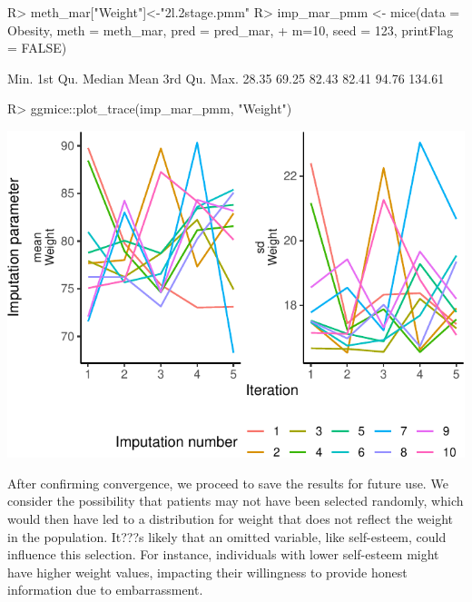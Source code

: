 \documentclass[
]{jss}
\begin{document}
\begin{CodeChunk}
\begin{CodeInput}
R> meth_mar["Weight"]<-"2l.2stage.pmm" 
R> imp_mar_pmm <- mice(data = Obesity, meth = meth_mar, pred = pred_mar,
+                     m=10, seed = 123, printFlag = FALSE)
\end{CodeInput}
\end{CodeChunk}

\begin{CodeChunk}
\begin{CodeOutput}
   Min. 1st Qu.  Median    Mean 3rd Qu.    Max. 
  28.35   69.25   82.43   82.41   94.76  134.61 
\end{CodeOutput}
\begin{CodeInput}
R> ggmice::plot_trace(imp_mar_pmm, "Weight")
\end{CodeInput}


\begin{center}\includegraphics{Imputation_of_Incomplete_Multilevel_Data_files/figure-latex/obesity-predmar_pmm1-1} \end{center}

\end{CodeChunk}

After confirming convergence, we proceed to save the results for future
use. We consider the possibility that patients may not have been
selected randomly, which would then have led to a distribution for
weight that does not reflect the weight in the population. It???s likely
that an omitted variable, like self-esteem, could influence this
selection. For instance, individuals with lower self-esteem might have
higher weight values, impacting their willingness to provide honest
information due to embarrassment.
\end{document}
